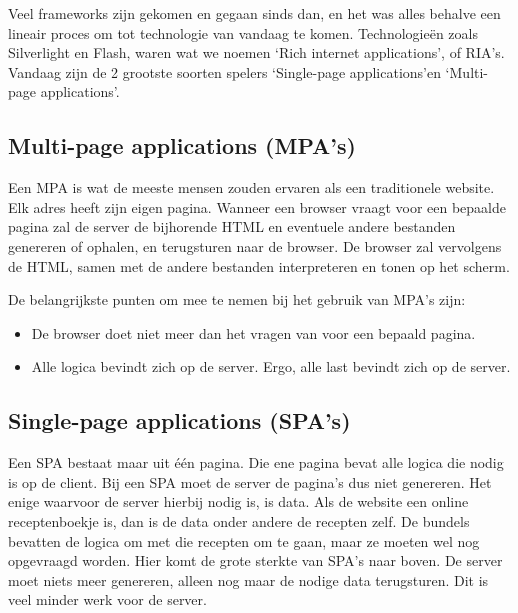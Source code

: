 Veel frameworks zijn gekomen en gegaan sinds dan, en het was alles behalve een lineair proces om tot technologie van vandaag te komen. Technologieën zoals Silverlight en Flash, waren wat we noemen \lq Rich internet applications\rq, of RIA's. Vandaag zijn de 2 grootste soorten spelers \lq Single-page applications\rq en \lq Multi-page applications\rq.


\subsection{Multi-page applications (MPA's)}

Een MPA is wat de meeste mensen zouden ervaren als een traditionele website. Elk adres heeft zijn eigen pagina. Wanneer een browser vraagt voor een bepaalde pagina zal de server de bijhorende HTML en eventuele andere bestanden genereren of ophalen, en terugsturen naar de browser. De browser zal vervolgens de HTML, samen met de andere bestanden interpreteren en tonen op het scherm.

De belangrijkste punten om mee te nemen bij het gebruik van MPA's zijn:

\begin{itemize}
    \item De browser doet niet meer dan het vragen van voor een bepaald pagina.
    \item Alle logica bevindt zich op de server.
    \subitem Ergo, alle last bevindt zich op de server.
\end{itemize}


\subsection{Single-page applications (SPA's)}

Een SPA bestaat maar uit één pagina. Die ene pagina bevat alle logica die nodig is op de client. Bij een SPA moet de server de pagina's dus niet genereren. Het enige waarvoor de server hierbij nodig is, is data. Als de website een online receptenboekje is, dan is de data onder andere de recepten zelf. De bundels bevatten de logica om met die recepten om te gaan, maar ze moeten wel nog opgevraagd worden. Hier komt de grote sterkte van SPA's naar boven. De server moet niets meer genereren, alleen nog maar de nodige data terugsturen. Dit is veel minder werk voor de server.

